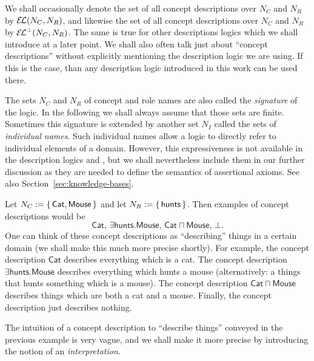 We shall occasionally denote the set of all \EL concept descriptions over $N_C$ and $N_R$
by ${\mathcal{E}\kern-.3ex\mathcal{L}}(N_C, N_R)$, and likewise the set of all \ELbot concept descriptions over $N_C$ and
$N_R$ by ${{\mathcal{E}\kern-.3ex\mathcal{L}}^\bot}(N_C, N_R)$.  The same is true for other descriptions logics which we
shall introduce at a later point.  We shall also often talk just about ``concept
descriptions'' without explicitly mentioning the description logic we are using.  If this
is the case, than any description logic introduced in this work can be used there.

The sets $N_C$ and $N_R$ of concept and role names are also called the \emph{signature} of
the logic.  In the following we shall always assume that those sets are finite.  Sometimes
this signature is extended by another set $N_I$ called the sets of \emph{individual
  names}.  Such individual names allow a logic to directly refer to individual elements of
a domain.  However, this expressiveness is not available in the description logics \EL and
\ELbot, but we shall nevertheless include them in our further discussion as they are
needed to define the semantics of assertional axioms.  See also
Section~\ref{sec:knowledge-bases}.

\begin{Example}
  \label{expl:tom-and-jerry-1}
  Let $N_C := {\{\, \mathsf{Cat}, \mathsf{Mouse} \,\}}$ and let $N_R := {\{\, \mathsf{hunts}
  \,\}}$.  Then examples of \ELbot concept descriptions would be
  \begin{equation*}
    \mathsf{Cat}, \, \mathsf{\exists hunts. Mouse}, \, \mathsf{Cat \sqcap Mouse}, \, \bot.
  \end{equation*}
  One can think of these concept descriptions as ``describing'' things in a certain domain
  (we shall make this much more precise shortly).  For example, the concept description
  $\mathsf{Cat}$ describes everything which is a cat.  The concept description
  $\mathsf{\exists hunts. Mouse}$ describes everything which hunts a mouse (alternatively:
  a things that hunts something which is a mouse).  The concept description $\mathsf{Cat
    \sqcap Mouse}$ describes things which are both a cat and a mouse.  Finally, the
  concept description just describes nothing.
\end{Example}

The intuition of a concept description to ``describe things'' conveyed in the previous
example is very vague, and we shall make it more precise by introducing the notion of an
\emph{interpretation}.

